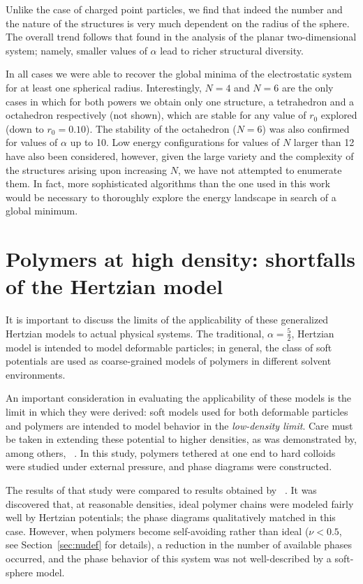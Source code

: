 {Unlike the case of charged point particles, we find that indeed 
the number and the nature of the structures is very much dependent on the radius of 
the sphere. The overall trend follows that found in the analysis of the planar two-dimensional system;
namely, smaller values of $\alpha$ lead to richer structural diversity.

In all cases we were able to recover the global minima of the electrostatic system for
at least one spherical radius. Interestingly, $N=4$ and $N=6$ are the only cases 
in which for both powers we obtain only one structure, 
a tetrahedron and a octahedron respectively (not shown), 
which are stable for any value of $r_0$ explored (down to $r_0=0.10$). 
The stability of the octahedron ($N=6$) was also confirmed 
for values of $\alpha$ up to 10. Low energy configurations for values of $N$ larger than 12 
have also been considered, however, given the large variety and the complexity of the structures
arising upon increasing $N$, we have not attempted to enumerate them. In fact, 
more sophisticated algorithms than the one used in this work would be necessary to thoroughly
explore the energy landscape in search of a global minimum.

\section{Polymers at high density: shortfalls of the Hertzian model}\label{sec:hertzprobs}
It is important to discuss the limits of the applicability of these generalized Hertzian models to actual physical systems.
The traditional, $\alpha = \frac{5}{2}$, Hertzian model is intended to model deformable particles; in general, the class of soft potentials are used as coarse-grained models of polymers in different solvent environments.

An important consideration in evaluating the applicability of these models is the limit in which they were derived: soft models used for both deformable particles and polymers are intended to model behavior in the \textit{low-density limit}.
Care must be taken in extending these potential to higher densities, as was demonstrated by, among others, \citeauthor{bozorgui}~\cite{bozorgui}.
In this study, polymers tethered at one end to hard colloids were studied under external pressure, and phase diagrams were constructed.

The results of that study were compared to results obtained by \citeauthor{capone}~\cite{capone}.
It was discovered that, at reasonable densities, ideal polymer chains were modeled fairly well by Hertzian potentials; the phase diagrams qualitatively matched in this case.
However, when polymers become self-avoiding rather than ideal ($\nu < 0.5$, see Section~\ref{sec:nudef} for details), a reduction in the number of available phases occurred, and the phase behavior of this system was not well-described by a soft-sphere model.

}
